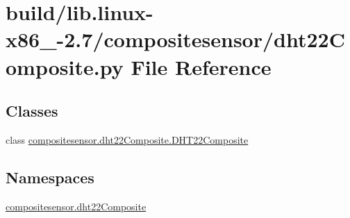\hypertarget{build_2lib_8linux-x86__64-2_87_2compositesensor_2dht22Composite_8py}{}\section{build/lib.linux-\/x86\+\_-\/2.7/compositesensor/dht22\+Composite.py File Reference}
\label{build_2lib_8linux-x86__64-2_87_2compositesensor_2dht22Composite_8py}
\subsection*{Classes}
\begin{DoxyCompactItemize}
\item 
class \hyperlink{classcompositesensor_1_1dht22Composite_1_1DHT22Composite}{compositesensor.\+dht22\+Composite.\+D\+H\+T22\+Composite}
\end{DoxyCompactItemize}
\subsection*{Namespaces}
\begin{DoxyCompactItemize}
\item 
 \hyperlink{namespacecompositesensor_1_1dht22Composite}{compositesensor.\+dht22\+Composite}
\end{DoxyCompactItemize}
